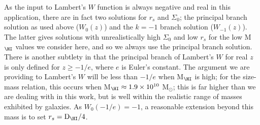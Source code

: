 As the input to Lambert's $W$ function is always negative and real in this application, there are in fact two solutions for $r_s$ and $\Sigma_0$; the principal branch solution as used above ($W_0(z)$) and the $k=-1$ branch solution ($W_{-1}(z)$). The latter gives solutions with unrealistically high $\Sigma_0$ and low $r_s$ for the low M$_{\HI}$ values we consider here, and so we always use the principal branch solution. There is another subtlety in that the principal branch of Lambert's $W$ for real $z$ is only defined for $z\geq-1/e$, where $e$ is Euler's constant. The argument we are providing to Lambert's $W$ will be less than $-1/e$ when M$_{\HI}$ is high; for the \cite{Wang2016b} \HI size-mass relation, this occurs when M$_{\HI}\approx1.9\times10^{10}$ M$_\odot$; this is far higher than we are dealing with in this work, but is well within the realistic range of \HI masses exhibited by galaxies. As $W_0(-1/e)=-1$, a reasonable extension beyond this mass is to set $r_s=\text{D}_{\HI}/4$.
